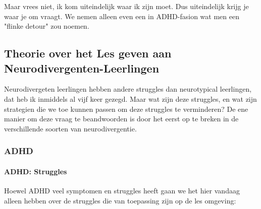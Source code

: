 \documentclass{article}
\begin{document}
        Maar vrees niet, ik kom uiteindelijk waar ik zijn moet. Dus uiteindelijk krijg je waar je om vraagt. We nemen alleen even een in ADHD-fasion wat men een "flinke detour" zou noemen.
        
        \subsection{Theorie over het Les geven aan Neurodivergenten-Leerlingen}

            Neurodivergeten leerlingen hebben andere struggles dan neurotypical leerlingen, dat heb ik inmiddels al vijf keer gezegd. Maar wat zijn deze struggles, en wat zijn strategien die we toe kunnen passen om deze struggles te verminderen? De ene manier om deze vraag te beandwoorden is door het eerst op te breken in de verschillende soorten van neurodivergentie\cite{neurodivergent-types}. 
            
            \subsubsection{ADHD}

                \bigskip\noindent\paragraph{ADHD: Struggles}

                    Hoewel ADHD veel symptomen en struggles heeft gaan we het hier vandaag alleen hebben over de struggles die van toepassing zijn op de les omgeving:
\end{document}
